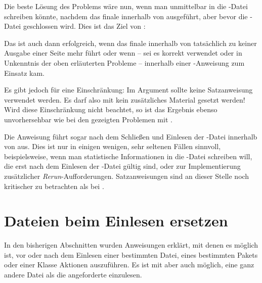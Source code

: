 Die beste Lösung des Problems wäre nun, wenn man unmittelbar in die
-Datei schreiben könnte, nachdem das finale
 innerhalb von 
ausgeführt, aber bevor die -Datei geschlossen wird. Dies ist das
Ziel von :
\begin{lstcode}
  \BeforeClosingMainAux{%
    \if@filesw
      \immediate\write\@auxout{\protect\writethistoaux}%
    \fi
  }
\end{lstcode}
Das ist auch dann erfolgreich, wenn das finale 
innerhalb von  tatsächlich zu keiner Ausgabe
einer Seite mehr führt oder wenn -- sei es korrekt verwendet oder in
Unkenntnis der oben erläuterten Probleme -- 
innerhalb einer -Anweisung zum Einsatz kam.

Es gibt jedoch für  eine Einschränkung: Im
Argument  sollte keine Satzanweisung verwendet
werden. Es darf also mit  kein zusätzliches
Material gesetzt werden! Wird diese Einschränkung nicht beachtet, so ist das
Ergebnis ebenso unvorhersehbar wie bei den gezeigten Problemen mit
.

Die Anweisung 
führt sogar  nach dem Schließen und Einlesen der
-Datei innerhalb von  aus. Dies ist
nur in einigen wenigen, sehr seltenen Fällen sinnvoll, beispielsweise, wenn
man statistische Informationen in die -Datei schreiben will, die
erst nach dem Einlesen der -Datei gültig sind, oder zur
Implementierung zusätzlicher \emph{Rerun}-Aufforderungen. Satzanweisungen sind
an dieser Stelle noch kritischer zu betrachten als bei
.%
%
\EndIndexGroup


\section{Dateien beim Einlesen ersetzen}

In den bisherigen Abschnitten wurden Anweisungen erklärt, mit denen es möglich
ist, vor oder nach dem Einlesen einer bestimmten Datei, eines bestimmten
Pakets oder einer Klasse Aktionen auszuführen. Es ist mit 
aber auch möglich, eine ganz andere Datei als die angeforderte einzulesen.

